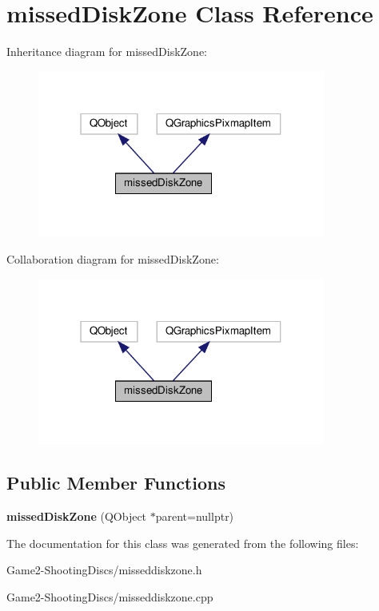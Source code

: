 \hypertarget{classmissedDiskZone}{}\section{missed\+Disk\+Zone Class Reference}
\label{classmissedDiskZone}


Inheritance diagram for missed\+Disk\+Zone\+:
\nopagebreak
\begin{figure}[H]
\begin{center}
\leavevmode
\includegraphics[width=268pt]{classmissedDiskZone__inherit__graph}
\end{center}
\end{figure}


Collaboration diagram for missed\+Disk\+Zone\+:
\nopagebreak
\begin{figure}[H]
\begin{center}
\leavevmode
\includegraphics[width=268pt]{classmissedDiskZone__coll__graph}
\end{center}
\end{figure}
\subsection*{Public Member Functions}
\begin{DoxyCompactItemize}
\item 
\mbox{\label{classmissedDiskZone_abb6e03300bfbb094d450914e1555db33}} 
{\bfseries missed\+Disk\+Zone} (Q\+Object $\ast$parent=nullptr)
\end{DoxyCompactItemize}


The documentation for this class was generated from the following files\+:\begin{DoxyCompactItemize}
\item 
Game2-\/\+Shooting\+Discs/misseddiskzone.\+h\item 
Game2-\/\+Shooting\+Discs/misseddiskzone.\+cpp\end{DoxyCompactItemize}
